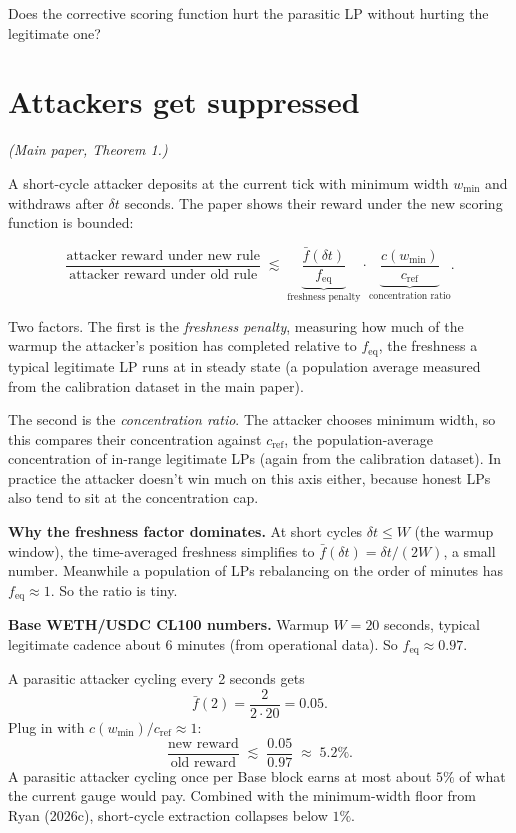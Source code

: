 \documentclass[11pt,a4paper]{article}
\begin{document}
Does the corrective scoring function hurt the parasitic LP without hurting the legitimate one?

\section{Attackers get suppressed}

\emph{(Main paper, Theorem 1.)}

A short-cycle attacker deposits at the current tick with minimum width $w_{\min}$ and withdraws after $\delta t$ seconds. The paper shows their reward under the new scoring function is bounded:

\begin{result}
\[
\frac{\text{attacker reward under new rule}}{\text{attacker reward under old rule}} \;\lesssim\; \underbrace{\frac{\bar f(\delta t)}{f_{\text{eq}}}}_{\text{freshness penalty}} \cdot \underbrace{\frac{c(w_{\min})}{c_{\text{ref}}}}_{\text{concentration ratio}}.
\]
\end{result}

Two factors. The first is the \emph{freshness penalty}, measuring how much of the warmup the attacker's position has completed relative to $f_{\text{eq}}$, the freshness a typical legitimate LP runs at in steady state (a population average measured from the calibration dataset in the main paper).

The second is the \emph{concentration ratio}. The attacker chooses minimum width, so this compares their concentration against $c_{\text{ref}}$, the population-average concentration of in-range legitimate LPs (again from the calibration dataset). In practice the attacker doesn't win much on this axis either, because honest LPs also tend to sit at the concentration cap.

\textbf{Why the freshness factor dominates.} At short cycles $\delta t \le W$ (the warmup window), the time-averaged freshness simplifies to $\bar f(\delta t) = \delta t/(2W)$, a small number. Meanwhile a population of LPs rebalancing on the order of minutes has $f_{\text{eq}} \approx 1$. So the ratio is tiny.

\begin{example}
\textbf{Base WETH/USDC CL100 numbers.} Warmup $W = 20$ seconds, typical legitimate cadence about 6 minutes (from operational data). So $f_{\text{eq}} \approx 0.97$.

A parasitic attacker cycling every 2 seconds gets
\[
\bar f(2) = \frac{2}{2 \cdot 20} = 0.05.
\]
Plug in with $c(w_{\min})/c_{\text{ref}} \approx 1$:
\[
\frac{\text{new reward}}{\text{old reward}} \;\lesssim\; \frac{0.05}{0.97} \;\approx\; 5.2\%.
\]
A parasitic attacker cycling once per Base block earns at most about $5\%$ of what the current gauge would pay. Combined with the minimum-width floor from Ryan (2026c), short-cycle extraction collapses below $1\%$.
\end{example}
\end{document}
